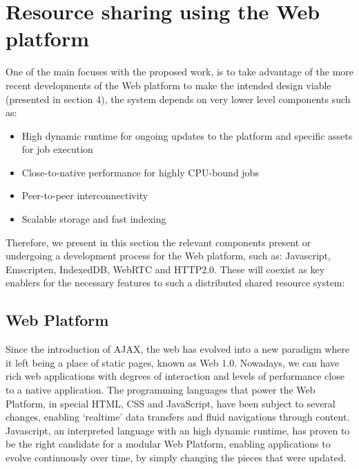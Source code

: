% 
% 
\section{Resource sharing using the Web platform} 

One of the main focuses with the proposed work, is to take advantage of the more recent developments of the Web platform to make the intended design viable (presented in section 4), the system depends on very lower level components such as:
\begin{itemize}
    \item High dynamic runtime for ongoing updates to the platform and specific assets for job execution
    \item Close-to-native performance for highly CPU-bound jobs
    \item Peer-to-peer interconnectivity
    \item Scalable storage and fast indexing
\end{itemize}

Therefore, we present in this section the relevant components present or undergoing a development process for the Web platform, such as: Javascript, Emscripten, IndexedDB, WebRTC and HTTP2.0. These will coexist as key enablers for  the necessary features to such a distributed shared resource system:

\subsection{Web Platform}

Since the introduction of AJAX\cite{Google/Mozzila/Opera}, the web has evolved into a new paradigm where it left being a place of static pages, known as Web 1.0. Nowadays, we can have rich web applications with degrees of interaction and levels of performance close to a native application. The programming languages that power the Web Platform, in special HTML, CSS and JavaScript\cite{Ecma2009}, have been subject to several changes, enabling `realtime' data transfers and fluid navigations through content. Javascript, an interpreted language with an high dynamic runtime, has proven to be the right candidate for a modular Web Platform, enabling applications to evolve continuously over time, by simply changing the pieces that were updated.

